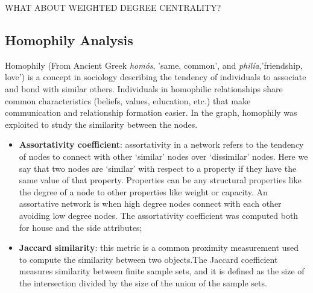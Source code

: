 \documentclass[10pt,twocolumn,letterpaper]{article}
\begin{document}
WHAT ABOUT WEIGHTED DEGREE CENTRALITY?



\subsection{Homophily Analysis}

Homophily (From Ancient Greek \textit{homós}, 'same, common', and \textit{philía},'friendship, love') is a concept in sociology describing the tendency of individuals to associate and bond with similar others. Individuals in homophilic relationships share common characteristics (beliefs, values, education, etc.) that make communication and relationship formation easier.
In the graph, homophily was exploited to study the similarity between the nodes.

\begin{itemize}
    \item \textbf{Assortativity coefficient}: assortativity in a network refers to the tendency of nodes to
connect with other ‘similar’ nodes over ‘dissimilar’ nodes.
Here we say that two nodes are ‘similar’ with respect to a property if they have the same
value of that property. Properties can be any structural properties like the degree of a
node to other properties like weight or capacity. An assortative network is when high
degree nodes connect with each other avoiding low degree nodes.
The assortativity coefficient was computed both for house and the side attributes;
\item \textbf{Jaccard similarity}: this metric is a common proximity measurement used to compute
the similarity between two objects.The Jaccard coefficient measures similarity between finite sample sets, and it is defined as the size of the intersection divided by the size of the union of the sample sets.
\end{itemize}
\end{document}
